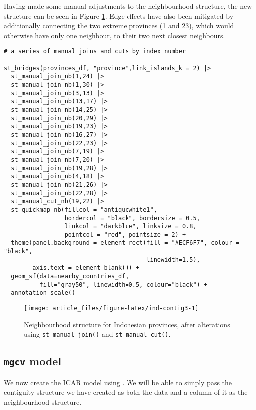 Having made some manual adjustments to the neighbourhood structure, the
new structure can be seen in Figure \ref{fig:ind-contig3}. Edge effects
have also been mitigated by additionally connecting the two extreme
provinces (1 and 23), which would otherwise have only one neighbour, to
their two next closest neighbours.



\begin{verbatim}
# a series of manual joins and cuts by index number

st_bridges(provinces_df, "province",link_islands_k = 2) |> 
  st_manual_join_nb(1,24) |> 
  st_manual_join_nb(1,30) |> 
  st_manual_join_nb(3,13) |> 
  st_manual_join_nb(13,17) |> 
  st_manual_join_nb(14,25) |> 
  st_manual_join_nb(20,29) |>
  st_manual_join_nb(19,23) |> 
  st_manual_join_nb(16,27) |> 
  st_manual_join_nb(22,23) |> 
  st_manual_join_nb(7,19) |> 
  st_manual_join_nb(7,20) |>
  st_manual_join_nb(19,28) |> 
  st_manual_join_nb(4,18) |> 
  st_manual_join_nb(21,26) |> 
  st_manual_join_nb(22,28) |> 
  st_manual_cut_nb(19,22) |> 
  st_quickmap_nb(fillcol = "antiquewhite1", 
                 bordercol = "black", bordersize = 0.5, 
                 linkcol = "darkblue", linksize = 0.8, 
                 pointcol = "red", pointsize = 2) + 
  theme(panel.background = element_rect(fill = "#ECF6F7", colour = "black", 
                                        linewidth=1.5),
        axis.text = element_blank()) +
  geom_sf(data=nearby_countries_df, 
          fill="gray50", linewidth=0.5, colour="black") + 
  annotation_scale()
\end{verbatim}

\begin{figure}

{\centering \texttt{[image: article\_files/figure-latex/ind-contig3-1]} 

}

\caption{Neighbourhood structure for Indonesian provinces, after alterations using \texttt{st\_manual\_join()} and \texttt{st\_manual\_cut()}.}\label{fig:ind-contig3}
\end{figure}

\hypertarget{mgcv-model}{%
\subsection{\texorpdfstring{\texttt{mgcv} model}{mgcv model}}\label{mgcv-model}}

We now create the ICAR model using . We will be able to simply pass
the contiguity structure we have created as both the data and a column
of it as the neighbourhood structure.

